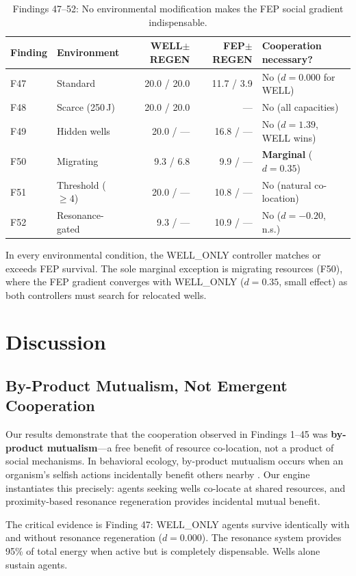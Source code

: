 \documentclass[12pt,a4paper]{article}
\begin{document}
\begin{table}[h]
\centering
\caption{Findings 47--52: No environmental modification makes the FEP social gradient indispensable.}
\label{tab:env}
\begin{tabular}{llrrl}
\toprule
Finding & Environment & WELL$\pm$REGEN & FEP$\pm$REGEN & Cooperation necessary? \\
\midrule
F47 & Standard & 20.0 / 20.0 & 11.7 / 3.9 & No ($d = 0.000$ for WELL) \\
F48 & Scarce (250\,J) & 20.0 / 20.0 & --- & No (all capacities) \\
F49 & Hidden wells & 20.0 / --- & 16.8 / --- & No ($d = 1.39$, WELL wins) \\
F50 & Migrating & 9.3 / 6.8 & 9.9 / --- & \textbf{Marginal} ($d = 0.35$) \\
F51 & Threshold ($\geq 4$) & 20.0 / --- & 10.8 / --- & No (natural co-location) \\
F52 & Resonance-gated & 9.3 / --- & 10.9 / --- & No ($d = -0.20$, n.s.) \\
\bottomrule
\end{tabular}
\end{table}

In every environmental condition, the WELL\_ONLY controller matches or exceeds FEP survival. The sole marginal exception is migrating resources (F50), where the FEP gradient converges with WELL\_ONLY ($d = 0.35$, small effect) as both controllers must search for relocated wells.

\section{Discussion}

\subsection{By-Product Mutualism, Not Emergent Cooperation}

Our results demonstrate that the cooperation observed in Findings 1--45 was \textbf{by-product mutualism}---a free benefit of resource co-location, not a product of social mechanisms. In behavioral ecology, by-product mutualism occurs when an organism's selfish actions incidentally benefit others nearby \cite{connor1995}. Our engine instantiates this precisely: agents seeking wells co-locate at shared resources, and proximity-based resonance regeneration provides incidental mutual benefit.

The critical evidence is Finding 47: WELL\_ONLY agents survive identically with and without resonance regeneration ($d = 0.000$). The resonance system provides 95\% of total energy when active but is completely dispensable. Wells alone sustain agents.
\end{document}
